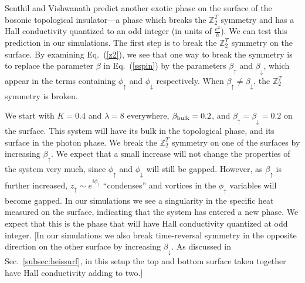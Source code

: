 \documentclass[prb,twocolumn]{revtex4-1}
\def\ztwot{\mathbb{Z}_2^T}
\begin{document}
Senthil and Vishwanath\cite{SenthilVishwanath} predict another exotic phase on the surface of the bosonic topological insulator---a phase which breaks the $\ztwot$ symmetry and has a Hall conductivity quantized to an odd integer (in units of $\frac{e^2}{h}$).  We can test this prediction in our simulations. The first step is to break the $\ztwot$ symmetry on the surface. By examining Eq.~(\ref{z2}), we see that one way to break the symmetry is to replace the parameter $\beta$ in Eq.~(\ref{sspin}) by the parameters $\beta_\uparrow$ and $\beta_\downarrow$, which appear in the terms containing $\phi_\uparrow$ and $\phi_\downarrow$ respectively. When $\beta_\uparrow \neq \beta_\downarrow$, the $\ztwot$ symmetry is broken.

We start with $K=0.4$ and $\lambda=8$ everywhere, $\beta_{\rm bulk}=0.2$, and $\beta_{\uparrow}=\beta_{\downarrow}=0.2$ on the surface. This system will have its bulk in the topological phase, and its surface in the photon phase. We break the $\ztwot$ symmetry on one of the surfaces by increasing $\beta_{\uparrow}$. We expect that a small increase will not change the properties of the system very much, since $\phi_\uparrow$ and $\phi_\downarrow$ will still be gapped.\cite{LesikAshvin2} However, as $\beta_\uparrow$ is further increased, $z_\uparrow \sim e^{i\phi_\uparrow}$ ``condenses'' and vortices in the $\phi_\uparrow$ variables will become gapped. In our simulations we see a singularity in the specific heat measured on the surface, indicating that the system has entered a new phase. We expect that this is the phase that will have Hall conductivity quantized at odd integer. [In our simulations we also break time-reversal symmetry in the opposite direction on the other surface by increasing $\beta_\downarrow$.  As discussed in Sec.~\ref{subsec:heissurf}, in this setup the top and bottom surface taken together have Hall conductivity adding to two.]
\end{document}
